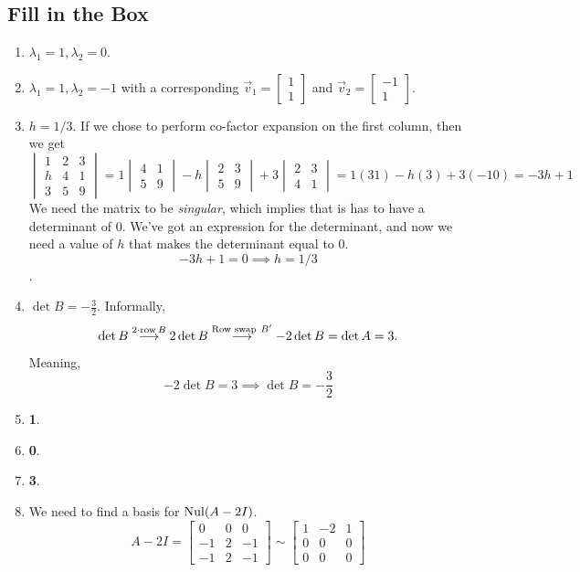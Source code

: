 \subsection{Fill in the Box}
\begin{enumerate}
	\item \(\lambda_1 = 1, \lambda_2 = 0\).
	\item \(\lambda_1 = 1, \lambda_2 = -1\) with a corresponding \(\vec{v}_1 = \begin{bmatrix}1 \\ 1\end{bmatrix}\) and \(\vec{v}_2 = \begin{bmatrix}-1 \\ 1\end{bmatrix}\).
	\item \(h = 1/3\). If we chose to perform co-factor expansion on the first column, then we get 
		\[\begin{vmatrix}1 & 2 & 3 \\ h & 4 & 1 \\ 3 & 5 & 9\end{vmatrix} 
		  = 1\begin{vmatrix}4 & 1 \\ 5 & 9\end{vmatrix} - h\begin{vmatrix}2 & 3 \\ 5 & 9\end{vmatrix} + 3 \begin{vmatrix}2 & 3 \\ 4 & 1\end{vmatrix} = 1(31) - h(3) + 3(-10) = -3h + 1\]
		We need the matrix to be \emph{singular}, which implies that is has to have a determinant of 0. We've got an expression for the determinant, and now we need a value of \(h\) that
		makes the determinant equal to 0. \[-3h + 1 = 0 \implies h = 1/3\].
	\item \(\det B = -\frac{3}{2}\). Informally,		
		\[\det B \overset{2 \cdot \row B}{\longrightarrow} 2\det B \overset{\text{Row swap} \ B'}{\longrightarrow} -2 \det B = \det A = 3.\]
		Meaning, \[-2\det B = 3 \implies \det B = -\frac{3}{2}\]
	\item \textbf{1}.
	\item \textbf{0}.
	\item \textbf{3}.
	\item We need to find a basis for \(\operatorname{Nul} (A - 2I)\). 
		\[A - 2I = \begin{bmatrix}0 & 0 & 0 \\ -1 & 2 & -1 \\ -1 & 2 & -1\end{bmatrix} \sim \begin{bmatrix}1 & -2 & 1 \\ 0 & 0 & 0 \\ 0 & 0 & 0\end{bmatrix}\]

\end{enumerate}
